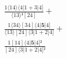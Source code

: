 \documentclass[varwidth, border=5pt]{standalone}
\begin{document}
\begin{my}
$\begin{gathered}
\scriptscriptstyle\frac{1⟨14⟩⟨4|1+3|4]}{⟨13⟩²[24]} +\\
\scriptscriptstyle\frac{1⟨34⟩[34]⟨4|𝟓|4]}{⟨13⟩[24]⟨3|1+2|4]} +\\
\scriptscriptstyle\frac{1[14]⟨4|𝟓|4]²}{[24]⟨3|1+2|4]²} \phantom{+}
\end{gathered}$
\end{my}
\end{document}
